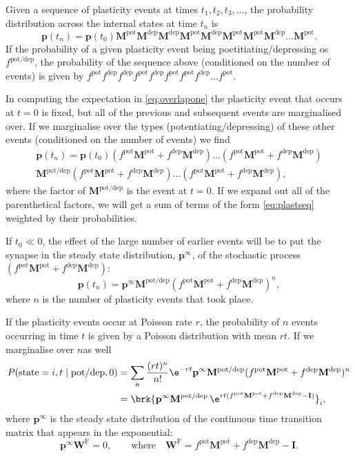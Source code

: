 \documentclass[12pt]{article}
\newcommand{\I}{\mathbf{I}}
\newcommand{\pr}{\mathbf{p}}
\newcommand{\eq}{\pr^\infty}
\newcommand{\W}{\mathbf{W}}
\newcommand{\M}{\mathbf{M}}
\newcommand{\frg}{\W^{\mathrm{F}}}
\newcommand{\pot}{^{\text{pot}}}
\newcommand{\dep}{^{\text{dep}}}
\newcommand{\potdep}{^{\text{pot/dep}}}
\begin{document}
Given a sequence of plasticity events at times $t_1,t_2,t_3,\ldots$, the probability distribution across the internal states at time $t_n$ is
%
\begin{equation}\label{eq:plastseq}
  \pr(t_n) = \pr(t_0)  \M\pot \M\dep \M\dep \M\pot \M\dep \M\pot \M\pot \M\dep \ldots \M\pot .
\end{equation}
%
If the probability of a given plasticity event being poetitiating/depressing os $f\potdep$, the probability of the sequence above (conditioned on the number of events) is given by $f\pot f\dep f\dep f\pot f\dep f\pot f\pot f\dep \ldots f\pot$.

In computing the expectation in \eqref{eq:overlapone} the plasticity event that occurs at $t=0$ is fixed, but all of the previous and subsequent events are marginalised over.
If we marginalise over the types (potentiating/depressing) of these other events (conditioned on the number of events) we find
%
\begin{multline}\label{eq:plastseqtypes}
  \pr(t_n) = \pr(t_0) (f\pot\M\pot+f\dep\M\dep)  \ldots (f\pot\M\pot+f\dep\M\dep) \\
    \M\potdep (f\pot\M\pot+f\dep\M\dep) \ldots (f\pot\M\pot+f\dep\M\dep),
\end{multline}
%
where the factor of $\M\potdep$ is the event at $t=0$.
If we expand out all of the parenthetical factors, we will get a sum of terms of the form \eqref{eq:plastseq} weighted by their probabilities.

If $t_0 \ll 0$, the effect of the large number of earlier events will be to put the synapse in the steady state distribution, $\eq$, of the stochastic process $(f\pot\M\pot+f\dep\M\dep)$:
%
\begin{equation}\label{eq:plastseqeq}
  \pr(t_n) = \eq \M\potdep (f\pot\M\pot+f\dep\M\dep)^n,
\end{equation}
%
where $n$ is the number of plasticity events that took place.

If the plasticity events occur at Poisson rate $r$, the probability of $n$ events occurring in time $t$ is given by a Poisson distribution with mean $rt$.
If we marginalise over $n$as well
%
\begin{equation}\label{eq:plastseqav}
\begin{aligned}
  P(\text{state}=i,t \mid \text{pot/dep},0) 
    &= \sum_n \frac{(rt)^n}{n!} \e^{-rt} \eq \M\potdep (f\pot\M\pot+f\dep\M\dep)^n \\
    &= \brk{ \eq \M\potdep\, \e^{rt(f\pot\M\pot+f\dep\M\dep-\I) } }_i,
\end{aligned}
\end{equation}
%
where $\eq$ is the steady state distribution of the continuous time transition matrix that appears in the exponential:
%
\begin{equation}\label{eq:eq}
  \eq\frg = 0,
  \qquad\text{where}\quad
  \frg = f\pot\M\pot + f\dep\M\dep - \I.
\end{equation}
%
\end{document}
